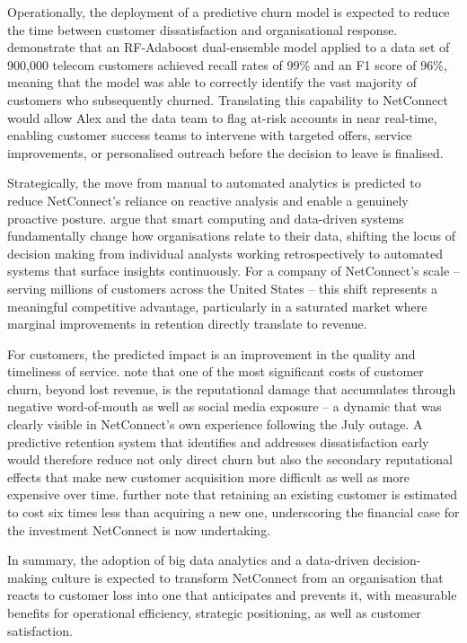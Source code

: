 \documentclass[12pt,a4paper]{article}
\begin{document}
Operationally, the deployment of a predictive churn model is expected to reduce the time between customer dissatisfaction and organisational response. \textcite{Zhou2023} demonstrate that an RF-Adaboost dual-ensemble model applied to a data set of 900,000 telecom customers achieved recall rates of 99\% and an F1 score of 96\%, meaning that the model was able to correctly identify the vast majority of customers who subsequently churned. Translating this capability to NetConnect would allow Alex and the data team to flag at-risk accounts in near real-time, enabling customer success teams to intervene with targeted offers, service improvements, or personalised outreach before the decision to leave is finalised.

Strategically, the move from manual to automated analytics is predicted to reduce NetConnect's reliance on reactive analysis and enable a genuinely proactive posture. \textcite{Sarker2021} argue that smart computing and data-driven systems fundamentally change how organisations relate to their data, shifting the locus of decision making from individual analysts working retrospectively to automated systems that surface insights continuously. For a company of NetConnect's scale -- serving millions of customers across the United States -- this shift represents a meaningful competitive advantage, particularly in a saturated market where marginal improvements in retention directly translate to revenue.

For customers, the predicted impact is an improvement in the quality and timeliness of service. \textcite{Sikri2024} note that one of the most significant costs of customer churn, beyond lost revenue, is the reputational damage that accumulates through negative word-of-mouth as well as social media exposure -- a dynamic that was clearly visible in NetConnect's own experience following the July outage. A predictive retention system that identifies and addresses dissatisfaction early would therefore reduce not only direct churn but also the secondary reputational effects that make new customer acquisition more difficult as well as more expensive over time. \textcite{Ahmad2019} further note that retaining an existing customer is estimated to cost six times less than acquiring a new one, underscoring the financial case for the investment NetConnect is now undertaking.

In summary, the adoption of big data analytics and a data-driven decision-making culture is expected to transform NetConnect from an organisation that reacts to customer loss into one that anticipates and prevents it, with measurable benefits for operational efficiency, strategic positioning, as well as customer satisfaction.
\end{document}
